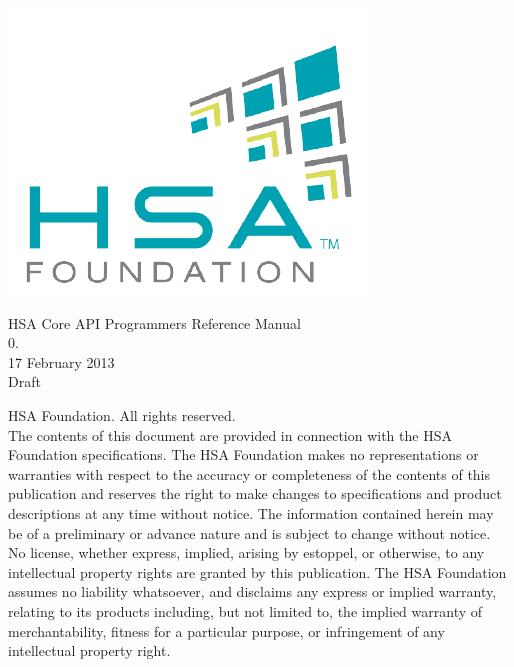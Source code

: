 \documentclass{book}
\begin{document}
\raggedright
\hypersetup{pageanchor=false,citecolor=blue}
\begin{titlepage}
\includegraphics[width=.5\textwidth]{fig/foundation.png}
\vspace*{7cm}
\begin{center}
{\Large H\-S\-A Core API Programmers Reference Manual\\[1ex]\large
0. }\\
\vspace*{1cm}
\vspace*{0.5cm}
{\small 17 February 2013}\\
\vspace*{0.5cm}
{\small Draft}\\
\end{center}
\end{titlepage}
\thispagestyle{empty}
{ HSA Foundation. All rights reserved.\\}
The contents of this document are provided in connection with the
HSA Foundation specifications. The HSA Foundation makes no
representations or warranties with respect to the accuracy or
completeness of the contents of this publication and reserves the
right to make changes to specifications and product descriptions at
any time without notice. The information contained herein may be of
a preliminary or advance nature and is subject to change without
notice. No license, whether express, implied, arising by estoppel,
or otherwise, to any intellectual property rights are granted by
this publication. The HSA Foundation assumes no liability
whatsoever, and disclaims any express or implied warranty, relating
to its products including, but not limited to, the implied warranty
of merchantability, fitness for a particular purpose, or
infringement of any intellectual property right.
\clearpage
{}
\tableofcontents
{}
\clearpage
\end{document}
